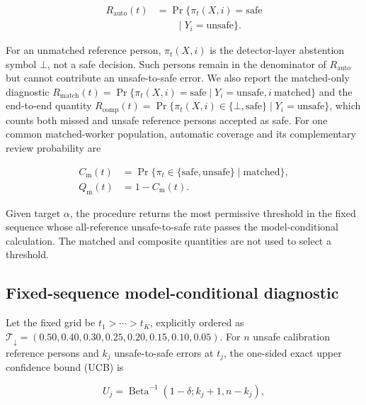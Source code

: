 \documentclass[iicol,pdflatex,sn-mathphys-num]{sn-jnl}
\begin{document}
\begin{equation}
\begin{aligned}
R_{\mathrm{auto}}(t)
&=\Pr\{\pi_t(X,i)=\mathrm{safe}\\
&\qquad\mid Y_i=\mathrm{unsafe}\}.
\end{aligned}
\label{eq:risk}
\end{equation}

For an unmatched reference person, $\pi_t(X,i)$ is the detector-layer abstention symbol $\bot$, not a safe decision. Such persons remain in the denominator of $R_{\mathrm{auto}}$ but cannot contribute an unsafe-to-safe error. We also report the matched-only diagnostic $R_{\mathrm{match}}(t)=\Pr\{\pi_t(X,i)=\mathrm{safe}\mid Y_i=\mathrm{unsafe},i\ \mathrm{matched}\}$ and the end-to-end quantity $R_{\mathrm{comp}}(t)=\Pr\{\pi_t(X,i)\in\{\bot,\mathrm{safe}\}\mid Y_i=\mathrm{unsafe}\}$, which counts both missed and unsafe reference persons accepted as safe. For one common matched-worker population, automatic coverage and its complementary review probability are

\begin{equation}
\begin{aligned}
C_{\mathrm{m}}(t)&=\Pr\{\pi_t\in\{\mathrm{safe},\mathrm{unsafe}\}\mid \mathrm{matched}\},\\
Q_{\mathrm{m}}(t)&=1-C_{\mathrm{m}}(t).
\end{aligned}
\end{equation}

Given target $\alpha$, the procedure returns the most permissive threshold in the fixed sequence whose all-reference unsafe-to-safe rate passes the model-conditional calculation. The matched and composite quantities are not used to select a threshold.

\subsection{Fixed-sequence model-conditional diagnostic}

Let the fixed grid be $t_1>\cdots>t_K$, explicitly ordered as $\mathcal{T}_{\downarrow}=(0.50,0.40,0.30,0.25,0.20,0.15,0.10,0.05)$. For $n$ unsafe calibration reference persons and $k_j$ unsafe-to-safe errors at $t_j$, the one-sided exact upper confidence bound (UCB) is

\begin{equation}
U_j=\operatorname{Beta}^{-1}(1-\delta;k_j+1,n-k_j),
\label{eq:cp}
\end{equation}
\end{document}
